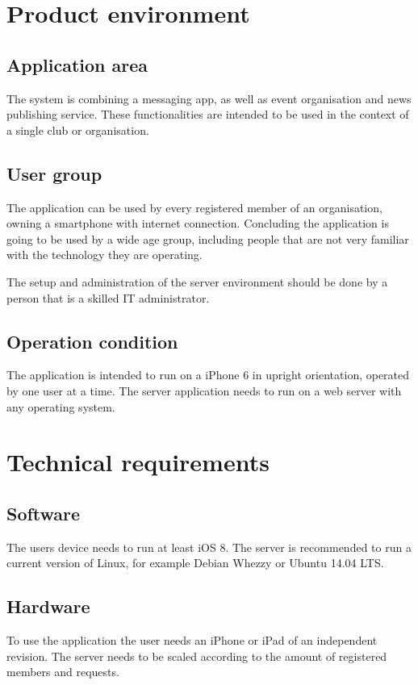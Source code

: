 \chapter{Product environment}
\section{Application area}
The system is combining a messaging app, as well as event organisation and news publishing service. These functionalities are intended to be used in the context of a single club or organisation.

\section{User group}
The application can be used by every registered member of an organisation, owning a smartphone with internet connection. Concluding the application is going to be used by a wide age group, including people that are not very familiar with the technology they are operating.

The setup and administration of the server environment should be done by a person that is a skilled IT administrator.

\section{Operation condition}
The application is intended to run on a iPhone 6 in upright orientation, operated by one user at a time. The server application needs to run on a web server with any operating system.

\chapter{Technical requirements}
\section{Software}
The users device needs to run at least iOS 8. The server is recommended to run a current version of Linux, for example Debian Whezzy or Ubuntu 14.04 LTS.

\section{Hardware}
To use the application the user needs an iPhone or iPad of an independent revision. The server needs to be scaled according to the amount of registered members and requests.

